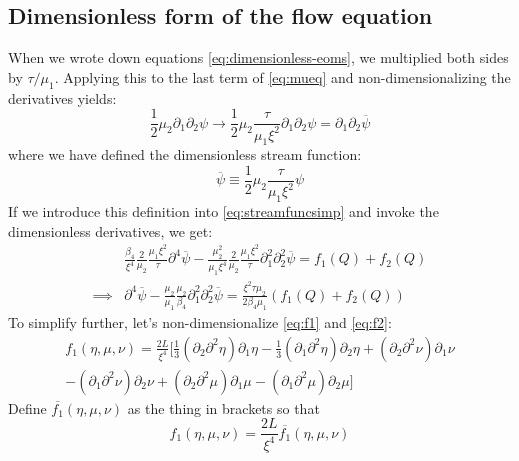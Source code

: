 \documentclass[reqno]{article}
\begin{document}
	
	\subsection{Dimensionless form of the flow equation}
	When we wrote down equations \eqref{eq:dimensionless-eoms}, we multiplied both sides by $\tau/\mu_1$. Applying this to the last term of \eqref{eq:mueq} and non-dimensionalizing the derivatives yields:
	\begin{equation}
		\frac{1}{2} \mu_2 \partial_1 \partial_2 \psi \to \frac{1}{2} \mu_2 \frac{\tau}{\mu_1 \xi^2} \partial_1 \partial_2 \psi = \partial_1 \partial_2 \overline{\psi}
	\end{equation}
	where we have defined the dimensionless stream function:
	\begin{equation}
		\overline{\psi} \equiv \frac12 \mu_2 \frac{\tau}{\mu_1 \xi^2} \psi
	\end{equation}
	If we introduce this definition into \eqref{eq:streamfuncsimp} and invoke the dimensionless derivatives, we get:
	\begin{equation}
	\begin{split}
		&\frac{\beta_4}{\xi^4} \frac{2}{\mu_2} \frac{\mu_1 \xi^2}{\tau} \partial^4 \overline{\psi}
		- \frac{\mu_2^2}{\mu_1 \xi^4} \frac{2}{\mu_2} \frac{\mu_1 \xi^2}{\tau} \partial_1^2 \partial_2^2 \overline{\psi}
		= f_1(Q) + f_2(Q) \\
		\implies &\partial^4 \overline{\psi}
		- \frac{\mu_2}{\mu_1} \frac{\mu_2}{\beta_4} \partial_1^2 \partial_2^2 \overline{\psi}
		= 
		\frac{\xi^2 \tau \mu_2}{2\beta_4 \mu_1} \left( f_1(Q) + f_2(Q) \right)
	\end{split}
	\end{equation}
	To simplify further, let's non-dimensionalize \eqref{eq:f1} and \eqref{eq:f2}:
	\begin{multline}
		f_1(\eta, \mu, \nu) = \frac{2L}{\xi^4} \bigg[ \tfrac13 \left( \partial_2\partial^2 \eta \right) \partial_1 \eta - \tfrac13 \left( \partial_1\partial^2 \eta\right)\partial_2 \eta + \left(\partial_2 \partial^2 \nu\right)\partial_1 \nu \\ - \left(\partial_1 \partial^2 \nu\right)\partial_2 \nu + \left(\partial_2 \partial^2 \mu\right)\partial_1 \mu - \left(\partial_1 \partial^2 \mu\right)\partial_2 \mu \bigg]
	\end{multline}
	Define $\overline{f_1}(\eta, \mu, \nu)$ as the thing in brackets so that
	\begin{equation}
		f_1(\eta, \mu, \nu) = \frac{2L}{\xi^4} \overline{f_1}(\eta, \mu, \nu)
	\end{equation}
\end{document}
